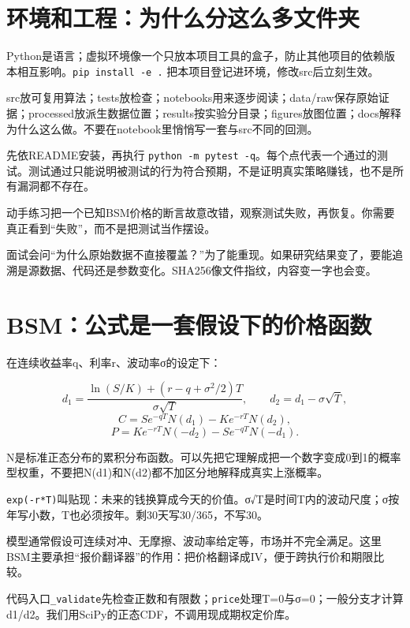 \documentclass[UTF8,11pt,a4paper]{ctexart}
\begin{document}
\section{环境和工程：为什么分这么多文件夹}

Python是语言；虚拟环境像一个只放本项目工具的盒子，防止其他项目的依赖版本相互影响。\texttt{pip install -e .} 把本项目登记进环境，修改src后立刻生效。

src放可复用算法；tests放检查；notebooks用来逐步阅读；data/raw保存原始证据；processed放派生数据位置；results按实验分目录；figures放图位置；docs解释为什么这么做。不要在notebook里悄悄写一套与src不同的回测。

先依README安装，再执行 \texttt{python -m pytest -q}。每个点代表一个通过的测试。测试通过只能说明被测试的行为符合预期，不是证明真实策略赚钱，也不是所有漏洞都不存在。

\begin{learningbox}{动手练习}把一个已知BSM价格的断言故意改错，观察测试失败，再恢复。你需要真正看到“失败”，而不是把测试当作摆设。\end{learningbox}

\begin{learningbox}{面试会问}“为什么原始数据不直接覆盖？”为了能重现。如果研究结果变了，要能追溯是源数据、代码还是参数变化。SHA256像文件指纹，内容变一字也会变。\end{learningbox}


\section{BSM：公式是一套假设下的价格函数}

在连续收益率q、利率r、波动率σ的设定下：

\[
d_1=\frac{\ln(S/K)+(r-q+\sigma^2/2)T}{\sigma\sqrt T},\qquad d_2=d_1-\sigma\sqrt T,
\]
\[
C=Se^{-qT}N(d_1)-Ke^{-rT}N(d_2),
\]
\[
P=Ke^{-rT}N(-d_2)-Se^{-qT}N(-d_1).
\]

N是标准正态分布的累积分布函数。可以先把它理解成把一个数字变成0到1的概率型权重，不要把N(d1)和N(d2)都不加区分地解释成真实上涨概率。

\texttt{exp(-r*T)}叫贴现：未来的钱换算成今天的价值。σ√T是时间T内的波动尺度；σ按年写小数，T也必须按年。剩30天写30/365，不写30。

模型通常假设可连续对冲、无摩擦、波动率给定等，市场并不完全满足。这里BSM主要承担“报价翻译器”的作用：把价格翻译成IV，便于跨执行价和期限比较。

\begin{learningbox}{代码入口}\texttt{\_validate}先检查正数和有限数；\texttt{price}处理T=0与σ=0；一般分支才计算d1/d2。我们用SciPy的正态CDF，不调用现成期权定价库。\end{learningbox}
\end{document}
